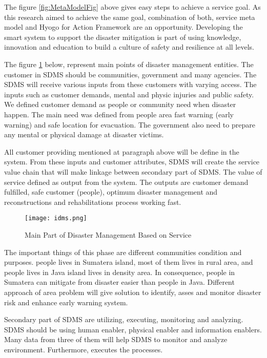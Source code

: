 The figure \ref{fig:MetaModelFig} above gives easy steps to achieve a service goal. As this research aimed to achieve the same goal, combination of both, service meta model and Hyogo for Action Framework are an opportunity. Developing the smart system to support the disaster mitigation is part of using knowledge, innovation and education to build a culture of  safety and resilience at all levels.\par 
 
The figure \ref{fig:MainPartDM} below, represent main points of disaster management entities. The customer in SDMS should be communities, government and many agencies. The SDMS will receive various inputs from these customers with varying access. The inputs such as customer demands, mental and physic injuries and public safety. We defined customer demand as people or community need when disaster happen. The main need was defined from people area fast warning (early warning) and safe location for evacuation. The government also need to prepare any mental or physical damage at disaster victims. \par 

All customer providing mentioned at paragraph above will be define in the system. From these inputs and customer attributes, SDMS will create the service value chain that will make linkage between secondary part of SDMS. The value of service defined as output from the system. The outputs are customer demand fulfilled, safe customer (people), optimum disaster management and reconstructions and rehabilitations process working fast.\par

\begin{figure}[H]
\begin{center}
\texttt{[image: idms.png]}
\caption{Main Part of Disaster Management Based on Service}
\label{fig:MainPartDM}
\end{center}
\end{figure}\par

The important things of this phase are different communities condition and purposes. people lives in Sumatera island, most of them lives in rural area, and people lives in Java island lives in density area. In consequence, people in Sumatera can mitigate from disaster easier than people in Java. Different approach of area problem  will give solution to identify, asses and monitor disaster risk and enhance early warning system. \par
Secondary part of SDMS are utilizing, executing, monitoring and analyzing. SDMS should be using human enabler, physical enabler and information enablers. Many data from three of them will help SDMS to monitor and analyze environment. Furthermore, executes the processes.\par
 
